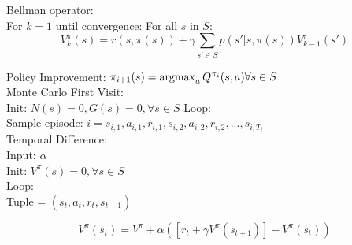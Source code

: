 Bellman operator: \\
For $k=1$ until convergence:
For all $s$ in $S$:
\[V_{k}^{\pi }(s)= r(s, \pi(s)) + \gamma \sum_{{s}'\in S}{ p({s}'|s, \pi (s))V_{k-1}^{\pi }({s}')}\]

\noindent Policy Improvement: $\pi_{i+1 }(s)= \operatorname*{argmax}_a Q^{\pi_{i}}(s,a) \forall s \in S$
\\
\noindent Monte Carlo First Visit: \\
Init: $ N(s) = 0, G(s) = 0, \forall s \in S $
Loop: \\
    Sample episode: $ i = s_{i,1}, a_{i,1}, r_{i,1}, s_{i,2}, a_{i,2}, r_{i,2}, ... , s_{i,T_i} $
\\
    Temporal Difference:\\
Input: $\alpha$ \\
Init: $ V^{\pi}(s)=0, \forall s \in S $ \\
Loop: \\
Tuple = $(s_{t},a_{t},r_{t},s_{t+1})$

\[V^\pi(s_{t}) = V^{\pi} + \alpha([r_{t}+\gamma V^{\pi}(s_{t+1})] - V^{\pi}(s_{t}))\]